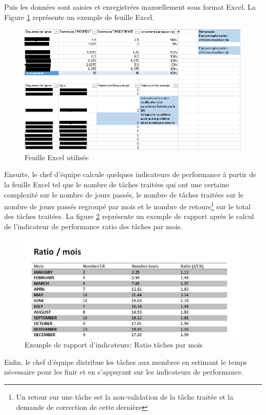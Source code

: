 Puis les données sont saisies et enregistrées manuellement sous format Excel. La Figure \ref{code5} représente un exemple de feuille Excel. 
\begin{figure}[H]
  \centering
  \includegraphics[scale=0.7]{figures/used_excel_file.png}
  \caption{Feuille Excel utilisée}
  \label{code5}
\end{figure}
Ensuite, le chef d'équipe calcule quelques indicateurs de performance à partir de la feuille Excel tel que le nombre de tâches traitées qui ont une certaine complexité sur le nombre de jours passés, le nombre de tâches traitées sur le nombre de jours passés regroupé par mois et le nombre de retours\footnote{Un retour sur une tâche est la non-validation de la tâche traitée et la demande de correction de cette dernière} sur le total des tâches traitées. La figure \ref{code9} représente un exemple de rapport après le calcul de l'indicateur de performance ratio des tâches par mois.
\begin{figure}[H]
  \centering
  \includegraphics[scale=1.06]{figures/ratio_mois_example.jpg}
  \caption{Exemple de rapport d'indicateurs: Ratio tâches par mois}
  \label{code9}
\end{figure}
Enfin, le chef d'équipe distribue les tâches aux membres en estimant le temps nécessaire pour les finir et en s’appuyant sur les indicateurs de performance.
